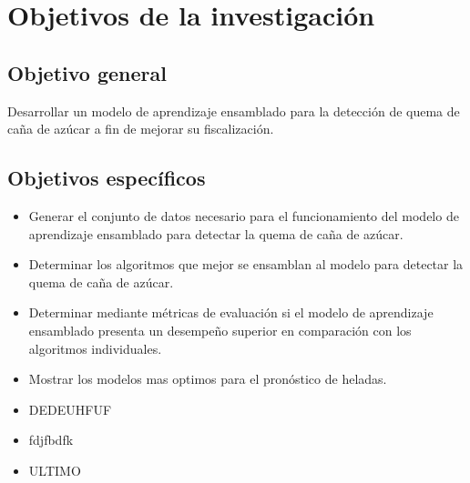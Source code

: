 \section{Objetivos de la investigación}
\subsection{Objetivo general}
Desarrollar un modelo de aprendizaje ensamblado para la detección de quema de caña de azúcar a fin de mejorar su fiscalización.
\subsection{Objetivos específicos}
\begin{itemize}
    \item Generar el conjunto de datos necesario para el funcionamiento del modelo de aprendizaje ensamblado para detectar la quema de caña de azúcar.
    \item Determinar los algoritmos que mejor se ensamblan al modelo para detectar la quema de caña de azúcar.
    \item Determinar mediante métricas de evaluación si el modelo de aprendizaje ensamblado presenta un desempeño superior en comparación con los algoritmos individuales.
    \item Mostrar los modelos mas optimos para el pronóstico de heladas.
    \item DEDEUHFUF
    \item fdjfbdfk
    \item ULTIMO 
\end{itemize}
